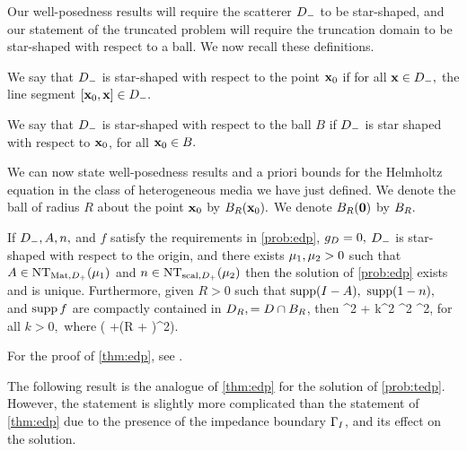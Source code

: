 
Our well-posedness results will require the scatterer $D_{-}$ to be star-shaped, and our statement of the truncated problem will require the truncation domain to be star-shaped with respect to a ball. We now recall these definitions.

  We say that $D_{-}$ is star-shaped with respect to the point $\mathbf{x}_{0}$ if for all $\mathbf{x} \in D_{-},$ the line segment $\mleft[\bxz,\bx\mright] \in \Dm.$

  We say that $D_{-}$ is star-shaped with respect to the ball $B$ if $D_{-}$ is star shaped with respect to $\mathbf{x}_{0}$, for all $\mathbf{x}_{0} \in B.$
  \ede

We can now state well-posedness results and a priori bounds for the Helmholtz equation in the class of heterogeneous media we have just defined.  We denote the ball of radius $R$ about the point $\mathbf{x}_{0}$ by $\Ball{R}{\bxz}.$ We denote $\Ball{R}{\bfzero}$ by $B_{R}.$



\label{thm:edp}
If $D_{-}, A, n,$ and $f$ satisfy the requirements in \cref{prob:edp}, $g_{D} = 0,$ $D_{-}$ is star-shaped with respect to the origin, and there exists $\mu_{1}, \mu_{2} > 0$ such that $A \in \NTADp{\muo}$ and $n \in \NTnDp{\mut}$ then the solution of \cref{prob:edp} exists and is unique. Furthermore, given $R>0$ such that $\supp\mleft(I-A\mright),$ $\operatorname{supp}(1-n),$ and $\operatorname{supp} f$ are compactly contained in $D_{R}, = D \cap B_{R}$, then
\beqs
\muo {}^2 + \mut k^2 ^2 \leq \Co {}^2,
\eeqs
for all $k>0,$ where
\beqs
\Co {}\mleft( +\mleft(R + \mright)^2\mright).
\eeqs
\enth

For the proof of \cref{thm:edp}, see \cite[Theorem 2.5]{GrPeSp:19}.

The following result is the analogue of \cref{thm:edp} for the solution of \cref{prob:tedp}. However, the statement is slightly more complicated than the statement of \cref{thm:edp} due to the presence of the impedance boundary $\Gamma_{I}$, and its effect on the solution.


